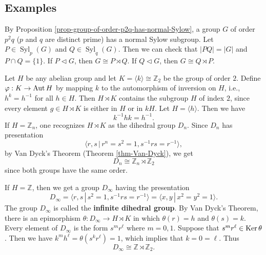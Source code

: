 

\subsection{Examples}
\begin{example}
	By Proposition \ref{prop-group-of-order-p2q-has-normal-Sylow}, a group $G$ of order $p^2q$ ($p$ and $q$ are distinct prime) has a normal Sylow subgroup. Let $P\in\operatorname{Syl}_p(G)$ and $Q\in\operatorname{Syl}_q(G)$. Then we can check that $|PQ| = |G|$ and $P\cap Q = \{1\}$. If $P\lhd G$, then $G \cong P\rtimes Q$. If $Q\lhd G$, then $G \cong Q\rtimes P$.
\end{example}
\begin{example}
	 Let $H$ be any abelian group and let $K = \langle k \rangle \cong \mathbb{Z}_2$ be the group of order $2$. Define $\varphi : K \rightarrow \operatorname{Aut} H$ by
	 mapping $k$ to the automorphism of inversion on $H$, i.e.,  $h^k = h^{-1}$ for all $h \in H$. Then $H\rtimes K$ contains the subgroup $H$ of index $2$, since every element $g\in H\rtimes K$ is either in $H$ or in $kH$. Let $H = \langle h\rangle$. Then we have $$k^{-1}hk = h^{-1}.$$  If $H = \mathbb{Z}_n $, one recognizes $H\rtimes K$ as the dihedral group $D_{n}$. Since $D_n$ has presentation $$\langle r,s\,|\, r^n = s^2 = 1, s^{-1}rs= r^{-1}\rangle,$$ by  Van Dyck's Theorem (Theorem \ref{thm-Van-Dyck}), we get
	$$D_n \cong \mathbb{Z}_n\rtimes \mathbb{Z}_2$$
	since both groups have the same order.
	
	 If $H = \mathbb{Z}$, then we get a group  $D_{\infty}$ having the presentation
	 \begin{equation*}
	 	D_{\infty} = \langle r,s\,|\,  s^2 = 1, s^{-1}rs= r^{-1}\rangle  = \langle x,y \,|\, x^2 = y^2 = 1\rangle.
	 \end{equation*} The group $D_{\infty}$  is called the \textbf{infinite dihedral group}. By  Van Dyck's Theorem, there is an epimorphism $\theta:D_{\infty}\rightarrow H\rtimes K$ in which $\theta(r) =  h$ and $\theta(s)= k$. Every element of $D_{\infty}$ is the form $s^m r^\ell$ where $m=0, 1$. Suppose that $s^m r^\ell \in\operatorname{Ker} \theta$. Then  we have  $ k^m h^\ell = \theta(s^k r^\ell)= 1$, which implies that  $k=0=\ell$. Thus 
	 \begin{equation*}
	 	D_{\infty} \cong \mathbb{Z}\rtimes \mathbb{Z}_2.
	 \end{equation*} 
\end{example}
	
